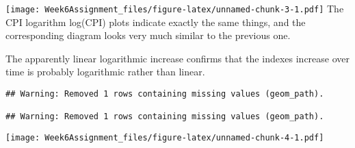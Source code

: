 \documentclass[]{article}
\newenvironment{Shaded}{\begin{snugshade}}{\end{snugshade}}
\newcommand{\DataTypeTok}[1]{\textcolor[rgb]{0.13,0.29,0.53}{#1}}
\newcommand{\KeywordTok}[1]{\textcolor[rgb]{0.13,0.29,0.53}{\textbf{#1}}}
\newcommand{\NormalTok}[1]{#1}
\newcommand{\OperatorTok}[1]{\textcolor[rgb]{0.81,0.36,0.00}{\textbf{#1}}}
\newcommand{\StringTok}[1]{\textcolor[rgb]{0.31,0.60,0.02}{#1}}
\begin{document}
\texttt{[image: Week6Assignment\_files/figure-latex/unnamed-chunk-3-1.pdf]}
The CPI logarithm log(CPI) plots indicate exactly the same things, and
the corresponding diagram looks very much similar to the previous one.

The apparently linear logarithmic increase confirms that the indexes
increase over time is probably logarithmic rather than linear.

\begin{Shaded}
\end{Shaded}

\begin{verbatim}
## Warning: Removed 1 rows containing missing values (geom_path).

## Warning: Removed 1 rows containing missing values (geom_path).
\end{verbatim}

\texttt{[image: Week6Assignment\_files/figure-latex/unnamed-chunk-4-1.pdf]}
\end{document}

